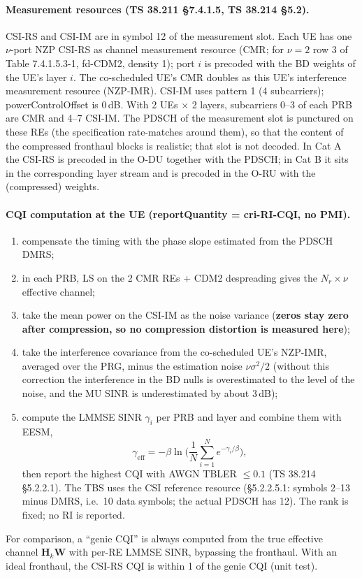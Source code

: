 \documentclass[11pt,a4paper]{article}
\newcommand{\dB}{\,dB}
\begin{document}
\paragraph{Measurement resources (TS 38.211 \S 7.4.1.5, TS 38.214 \S 5.2).} CSI-RS and CSI-IM are in symbol 12 of the
measurement slot. Each UE has one $\nu$-port NZP CSI-RS as channel measurement resource (CMR; for $\nu=2$ row 3 of Table
7.4.1.5.3-1, fd-CDM2, density 1); port $i$ is precoded with the BD weights of the UE's layer $i$. The co-scheduled UE's CMR doubles
as this UE's interference measurement resource (NZP-IMR). CSI-IM uses pattern 1 (4 subcarriers); powerControlOffset is 0\dB.
With 2 UEs $\times$ 2 layers, subcarriers 0--3 of each PRB are CMR and 4--7 CSI-IM. The PDSCH of the measurement slot is punctured
on these REs (the specification rate-matches around them), so that the content of the compressed fronthaul blocks is realistic;
that slot is not decoded. In Cat A the CSI-RS is precoded in the O-DU together with the PDSCH; in Cat B it sits in the
corresponding layer stream and is precoded in the O-RU with the (compressed) weights.

\paragraph{CQI computation at the UE (reportQuantity = cri-RI-CQI, no PMI).}
\begin{enumerate}
  \item compensate the timing with the phase slope estimated from the PDSCH DMRS;
  \item in each PRB, LS on the 2 CMR REs + CDM2 despreading gives the $N_r \times \nu$ effective channel;
  \item take the mean power on the CSI-IM as the noise variance (\textbf{zeros stay zero after compression, so no compression
        distortion is measured here});
  \item take the interference covariance from the co-scheduled UE's NZP-IMR, averaged over the PRG, minus the estimation noise
        $\nu\sigma^2/2$ (without this correction the interference in the BD nulls is overestimated to the level of the noise,
        and the MU SINR is underestimated by about 3\dB);
  \item compute the LMMSE SINR $\gamma_i$ per PRB and layer and combine them with EESM,
        \begin{equation}
          \gamma_{\mathrm{eff}} = -\beta \ln\!\Big( \frac{1}{N} \sum_{i=1}^{N} e^{-\gamma_i/\beta} \Big),
        \end{equation}
        then report the highest CQI with AWGN TBLER $\le 0.1$ (TS 38.214 \S 5.2.2.1). The TBS uses the CSI reference resource
        (\S 5.2.2.5.1: symbols 2--13 minus DMRS, i.e.\ 10 data symbols; the actual PDSCH has 12). The rank is fixed; no RI is
        reported.
\end{enumerate}
For comparison, a ``genie CQI'' is always computed from the true effective channel $\mathbf H_k \mathbf W$ with per-RE LMMSE SINR,
bypassing the fronthaul. With an ideal fronthaul, the CSI-RS CQI is within 1 of the genie CQI (unit test).
\end{document}

